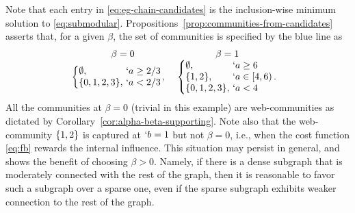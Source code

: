 \begin{example}
	Note that each entry in \eqref{eq:eg-chain-candidates} is the inclusion-wise minimum solution to
	\eqref{eq:submodular}. 
	Propositions~\ref{prop:communities-from-candidates} asserts that, for a given $\beta$, the set of
	communities is specified by the blue line as 
	\begin{align}
		\label{eq:eg-chain}
		\begin{array}{c@{\quad}c}
			 \beta = 0 & \beta = 1 \\%
			\!\!
			\!\!
			\left\{
				\!\!\!
				\begin{array}{l@{\ }l}
					\emptyset, & `a \geq  2/3 
					\\
					\Set{0,1,2,3}, & `a < 2/3
				\end{array}\!\!,
			\right.
			&
			\left\{
				\!\!\!
				\begin{array}{l@{\ }l}
					\emptyset, & `a \geq 6
					\\
					\Set{1,2}, & `a \in  [4, 6)
					\\
					\Set{0,1,2,3}, & `a < 4
				\end{array}\!\!.
			\right.
		\end{array}
	\end{align}
	All the communities at $\beta = 0$ (trivial in this example) are web-communities as
	dictated by Corollary~\ref{cor:alpha-beta-supporting}.
	Note also that
	the web-community $\{1,2\}$ is captured at $`b = 1$ but not $\beta=0$, i.e., when the cost
	function \eqref{eq:fb} rewards the internal influence.%
	This situation may persist in general, and shows the benefit of choosing $\beta > 0$.  Namely, if
	there is a dense subgraph that is moderately connected with the rest of the graph, then it is
	reasonable to favor such a subgraph over a sparse one, even if the sparse subgraph exhibits
	weaker connection to the rest of the graph. 
\end{example}
